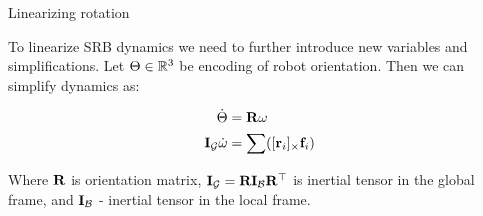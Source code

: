 \documentclass{beamer}
\begin{document}
\begin{frame}{Linearizing rotation}
	\begin{flushleft}
		
		To linearize SRB dynamics we need to further introduce new variables and simplifications. Let $\Theta \in \mathbb{R}^3$ be encoding of robot orientation. Then we can simplify dynamics as:
		
		\begin{align}
			\dot \Theta &= \mathbf{R}\omega 
			\\
			\mathbf{I}_\mathcal{G} \dot \omega &= \sum ( [\mathbf{r}_i]_\times \mathbf{f}_i)
		\end{align}
		
		Where $\mathbf{R}$ is orientation matrix, $\mathbf{I}_\mathcal{G} = \mathbf{R} \mathbf{I}_\mathcal{B} \mathbf{R}^\top $ is inertial tensor in the global frame, and $\mathbf{I}_\mathcal{B}$ - inertial tensor in the local frame.
		
	\end{flushleft}
\end{frame}
\end{document}
